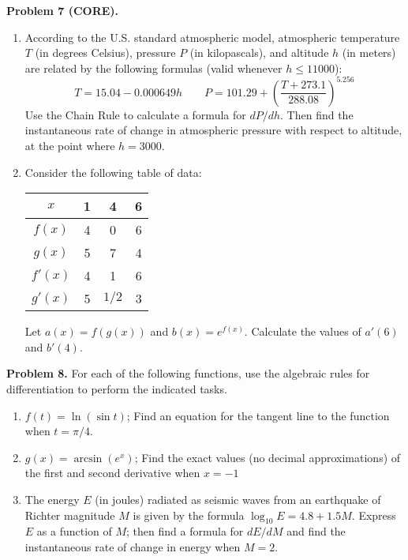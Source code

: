 \documentclass[addpoints]{exam}
\begin{document}
\vspace{0.3in}

\noindent
\textbf{Problem 7 (CORE).} 
	\begin{enumerate}
		\item According to the U.S. standard atmospheric model, atmospheric temperature $T$ (in degrees Celsius), pressure $P$ (in kilopascals), and altitude $h$ (in meters) are related by the following formulas (valid whenever $h \leq 11000$):
		$$T = 15.04 - 0.000649h \qquad P = 101.29 + \left( \frac{T + 273.1}{288.08} \right)^{5.256}$$
		Use the Chain Rule to calculate a formula for $dP/dh$. Then find the instantaneous rate of change in atmospheric pressure with respect to altitude, at the point where $h = 3000$. 
		\item Consider the following table of data: 
		\begin{center}
			\begin{tabular}{c||c|c|c}
			$x$ & 1 & 4 & 6 \\ \hline
			$f(x)$ & 4 & 0 & 6 \\ 
			$g(x)$ & 5 & 7 & 4 \\
			$f'(x)$ & 4 & 1 & 6 \\
			$g'(x)$ & 5 & $1/2$ & 3
			\end{tabular}
		\end{center}
		Let $a(x) = f(g(x))$ and $b(x) = e^{f(x)}$. Calculate the values of $a'(6)$ and $b'(4)$. 
	\end{enumerate}


\vspace{0.3in}

\noindent
\textbf{Problem 8.} For each of the following functions, use the algebraic rules for differentiation to perform the indicated tasks. 
	\begin{enumerate}
		\item $f(t) = \ln(\sin t)$; Find an equation for the tangent line to the function when $t = \pi/4$. 
		\item $g(x) = \arcsin(e^x)$; Find the exact values (no decimal approximations) of the first and second derivative when $x = -1$
		\item The energy $E$ (in joules) radiated as seismic waves from an earthquake of Richter magnitude $M$ is given by the formula $\log_{10} E = 4.8 + 1.5M$. Express $E$ as a function of $M$; then find a formula for $dE/dM$ and find the instantaneous rate of change in energy when $M = 2$. 
 	\end{enumerate}
\end{document}
